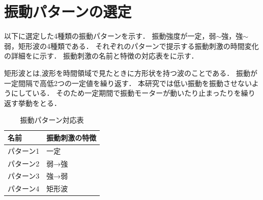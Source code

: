 \newpage
\section{振動パターンの選定}
以下に選定した4種類の振動パターンを示す．
振動強度が一定，弱$\sim$強，強$\sim$弱，矩形波の4種類である．
それぞれのパターンで提示する振動刺激の時間変化の詳細をに示す．
振動刺激の名前と特徴の対応表をに示す．

矩形波とは,波形を時間領域で見たときに方形状を持つ波のことである．
振動が一定間隔で高低2つの一定値を繰り返す．
本研究では低い振動を振動させないようにしている．
そのため一定期間で振動モーターが動いたり止まったりを繰り返す挙動をとる．

\begin{table}[H]
    \caption{振動パターン対応表}
    \centering
    \begin{tabular}{l|l}
    \hline
    \hline
    名前 & 振動刺激の特徴 \\
    \hline
    パターン1 & 一定 \\
    パターン2 & 弱→強 \\
    パターン3 & 強→弱 \\
    パターン4 & 矩形波 \\
    \hline
    \end{tabular}
    \label{tab;sindou}
\end{table}


